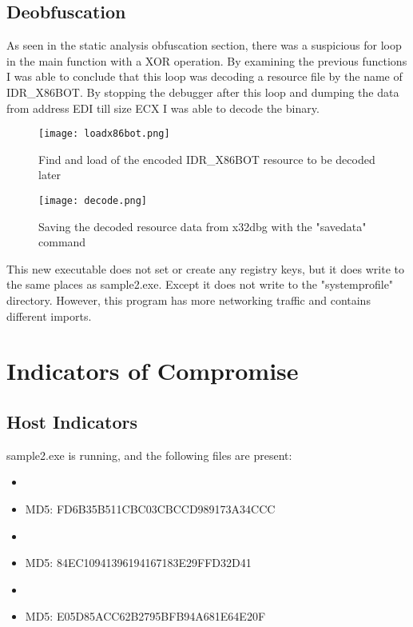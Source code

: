 \documentclass{article}
\begin{document}
    \subsection{Deobfuscation}
    As seen in the static analysis obfuscation section, there was a suspicious for loop in the main function with a XOR operation. By examining the previous functions I was able to conclude that this loop was decoding a resource file by the name of IDR{\_}X86BOT. By stopping the debugger after this loop and dumping the data from address EDI till size ECX I was able to decode the binary. 
    \begin{figure}[H]
        \texttt{[image: loadx86bot.png]}
        \caption{Find and load of the encoded IDR{\_}X86BOT resource to be decoded later}
    \end{figure}
    \begin{figure}[H]
        \texttt{[image: decode.png]}
        \caption{Saving the decoded resource data from x32dbg with the "savedata" command}
    \end{figure}
    
    This new executable does not set or create any registry keys, but it does write to the same places as sample2.exe. Except it does not write to the "systemprofile" directory. However, this program has more networking traffic and contains different imports.
    \pagebreak
    \section{Indicators of Compromise}
    \subsection{Host Indicators}
    sample2.exe is running, and the following files are present:
    \begin{itemize}
        \item {}
        \item MD5: FD6B35B511CBC03CBCCD989173A34CCC
        \item {}
        \item MD5: 84EC10941396194167183E29FFD32D41
        \item {}
        \item MD5: E05D85ACC62B2795BFB94A681E64E20F
    \end{itemize}
\end{document}
